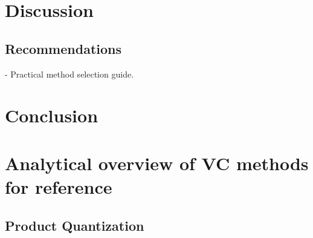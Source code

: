 \documentclass[sigconf]{acmart}
\begin{document}




\section{Discussion}
\subsection{Recommendations}
- Practical method selection guide.


\section{Conclusion}

\appendix

\section{Analytical overview of VC methods for reference}

\subsection{Product Quantization}
\end{document}
